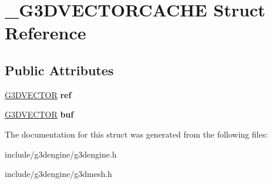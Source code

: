 \hypertarget{struct__G3DVECTORCACHE}{}\section{\+\_\+\+G3\+D\+V\+E\+C\+T\+O\+R\+C\+A\+C\+HE Struct Reference}
\label{struct__G3DVECTORCACHE}
\subsection*{Public Attributes}
\begin{DoxyCompactItemize}
\item 
\mbox{\label{struct__G3DVECTORCACHE_ab84ecab4255c76858023da004cf79902}} 
\hyperlink{struct__G3DVECTOR}{G3\+D\+V\+E\+C\+T\+OR} {\bfseries ref}
\item 
\mbox{\label{struct__G3DVECTORCACHE_a43fdbf2d534d23bcfd67df54a9c575bb}} 
\hyperlink{struct__G3DVECTOR}{G3\+D\+V\+E\+C\+T\+OR} {\bfseries buf}
\end{DoxyCompactItemize}


The documentation for this struct was generated from the following files\+:\begin{DoxyCompactItemize}
\item 
include/g3dengine/g3dengine.\+h\item 
include/g3dengine/g3dmesh.\+h\end{DoxyCompactItemize}
